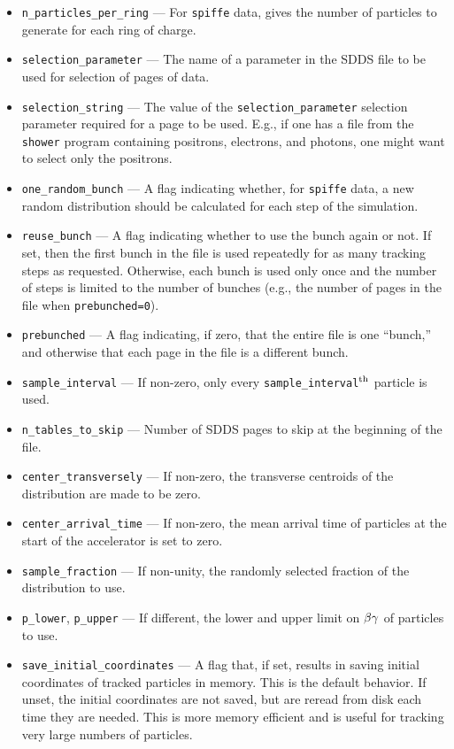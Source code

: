 \documentclass[11pt]{article}
\begin{document}
\begin{itemize}
\item \verb|n_particles_per_ring| --- For {\tt spiffe} data, gives the number of particles to
generate for each ring of charge.
\item \verb|selection_parameter| --- The name of a parameter in the SDDS file to be used for selection
of pages of data.
\item \verb|selection_string| --- The value of the
\verb|selection_parameter| selection parameter required for a page to
be used.  E.g., if one has a file from the {\tt shower} program
containing positrons, electrons, and photons, one might want to select
only the positrons.
\item \verb|one_random_bunch| --- A flag indicating whether, for {\tt spiffe} data, a new random
distribution should be calculated for each step of the simulation.
\item \verb|reuse_bunch| --- A flag indicating whether to use the bunch again or not.  If set, then the first bunch in the
file is used repeatedly for as many tracking steps as requested.  Otherwise, each bunch is used only once and the number of
steps is limited to the number of bunches (e.g., the number of pages in the file when \verb|prebunched=0|).
\item \verb|prebunched| --- A flag indicating, if zero, that the entire file is one ``bunch,'' and otherwise that each page in the file is a different bunch.
\item \verb|sample_interval| --- If non-zero, only every \verb|sample_interval|$^{\rm th}$ particle is used.
\item \verb|n_tables_to_skip| --- Number of SDDS pages to skip at the beginning of the file.
\item \verb|center_transversely| --- If non-zero, the transverse centroids of the distribution are made to be zero.
\item \verb|center_arrival_time| --- If non-zero, the mean arrival time of particles at the start of the
accelerator is set to zero.
\item \verb|sample_fraction| --- If non-unity, the randomly selected fraction of the distribution to use.
\item \verb|p_lower|, \verb|p_upper| --- If different, the lower and upper limit on ${\rm \beta\gamma}$ of particles to use.
\item \verb|save_initial_coordinates| --- A flag that, if set, results in saving initial coordinates
of tracked particles in memory.  This is the default behavior.  If unset, the initial coordinates
are not saved, but are reread from disk each time they are needed.  This is more memory efficient
and is useful for tracking very large numbers of particles.
\end{itemize}
\end{document}

